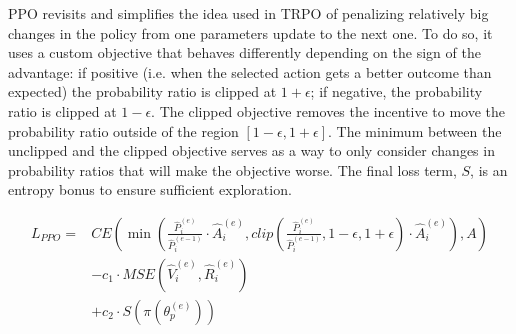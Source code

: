 \documentclass{article}
\begin{document}
PPO revisits and simplifies the idea used in TRPO of penalizing relatively big changes in the policy from one parameters update to the next one. To do so, it uses a custom objective that behaves differently depending on the sign of the advantage: if positive (i.e. when the selected action gets a better outcome than expected) the probability ratio is clipped at $1+\epsilon$; if negative, the probability ratio is clipped at $1-\epsilon$. The clipped objective removes the incentive to move the probability ratio outside of the region $[1-\epsilon, 1+\epsilon]$. The minimum between the unclipped and the clipped objective serves as a way to only consider changes in probability ratios that will make the objective worse. The final loss term, $S$, is an entropy bonus to ensure sufficient exploration.

\begin{equation}
  \label{eq:ppo}
  \begin{aligned}
    L_{PPO}={} & CE\left(\min\left(\frac{\hat{P}_i^{(e)}}{\hat{P}_i^{(e-1)}}\cdot \hat{A}_i^{(e)}, clip\left(\frac{\hat{P}_i^{(e)}}{\hat{P}_i^{(e-1)}}, 1-\epsilon, 1+\epsilon\right)\cdot \hat{A}_i^{(e)}\right), A\right) \\
    & - c_1\cdot MSE\left(\hat{V}_i^{(e)}, \hat{R}_i^{(e)}\right) \\
    & + c_2\cdot S\left(\pi(\theta_p^{(e)})\right) \\
  \end{aligned}
\end{equation}
\end{document}
